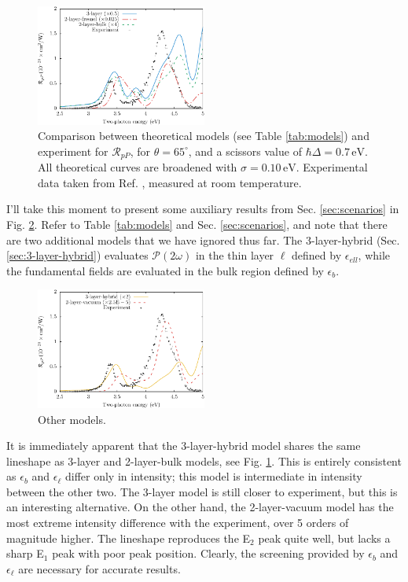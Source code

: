 \begin{figure}[H]
\centering 
\includegraphics[width=0.5\textwidth]{content/figures/fig-Si1x1-Mejia_RpP}
\caption{Comparison between theoretical models (see Table \ref{tab:models}) and experiment for $\mathcal{R}_{pP}$, for $\theta=65^{\circ}$, and a scissors value of $\hbar\Delta = 0.7\,\text{eV}$. All theoretical curves are broadened with $\sigma=0.10\,\text{eV}$. Experimental data taken from Ref. \cite{mejiaPRB02}, measured at room temperature.}
\label{fig:RpP}
\end{figure}

I'll take this moment to present some auxiliary results from Sec. \ref{sec:scenarios} in Fig. \ref{fig:othermodels}. Refer to Table \ref{tab:models} and Sec. \ref{sec:scenarios}, and note that there are two additional models that we have ignored thus far. The 3-layer-hybrid (Sec. \ref{sec:3-layer-hybrid}) evaluates $\mathcal{P}(2\omega)$ in the thin layer $\ell$ defined by $\epsilon_{ell}$, while the fundamental fields are evaluated in the bulk region defined by $\epsilon_{b}$.

\begin{figure}[H]
\centering 
\includegraphics[width=0.5\textwidth]{content/figures/fig-Si1x1-Mejia_RpP_models}
\caption{Other models. \label{fig:othermodels}}
\end{figure}

It is immediately apparent that the 3-layer-hybrid model shares the same lineshape as 3-layer and 2-layer-bulk models, see Fig. \ref{fig:RpP}. This is entirely consistent as $\epsilon_{b}$ and $\epsilon_{\ell}$ differ only in intensity; this model is intermediate in intensity between the other two. The 3-layer model is still closer to experiment, but this is an interesting alternative. On the other hand, the 2-layer-vacuum model has the most extreme intensity difference with the experiment, over 5 orders of magnitude higher. The lineshape reproduces the E$_{2}$ peak quite well, but lacks a sharp E$_{1}$ peak with poor peak position. Clearly, the screening provided by $\epsilon_{b}$ and $\epsilon_{\ell}$ are necessary for accurate results.

